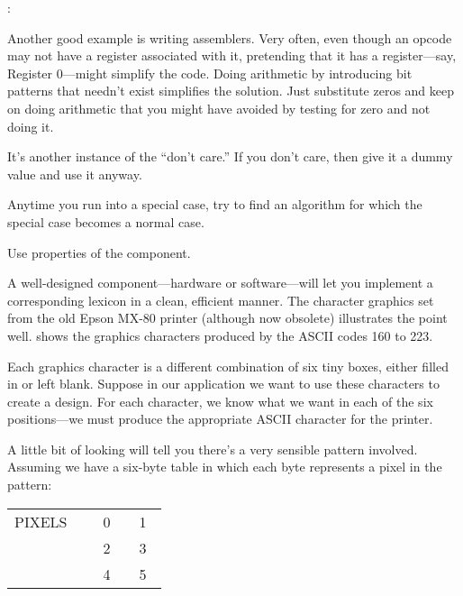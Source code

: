 \begin{interview}
:
\begin{tfquot}
Another good example is writing assemblers. Very often, even though an
opcode may not have a register associated with it, pretending that it has a
register---say, Register 0---might simplify the code. Doing arithmetic by
introducing bit patterns that needn't exist simplifies the solution. Just
substitute zeros and keep on doing arithmetic that you might have avoided
by testing for zero and not doing it.

It's another instance of the ``don't care.'' If you don't care, then give
it a dummy value and use it anyway.
\end{tfquot}
\end{interview}
Anytime you run into a special case, try to find an algorithm for which
the special case becomes a normal case.

\begin{tip}
Use properties of the component.
\end{tip}
A well-designed component---hardware or software---will let you implement
a corresponding lexicon in a clean, efficient manner. The character
graphics set from the old Epson MX-80 printer (although now obsolete)
illustrates the point well.  shows the graphics characters
produced by the ASCII codes 160 to 223.



Each graphics character is a different combination of six tiny boxes,
either filled in or left blank. Suppose in our application we want to use
these characters to create a design. For each character, we know what we
want in each of the six positions---we must produce the appropriate
ASCII character for the printer.

A little bit of looking will tell you there's a very sensible pattern
involved. Assuming we have a six-byte table in which each byte represents
a pixel in the pattern:

\bigskip
{\sf\begin{tabular}{l|c|c|} \cline{2-3}
PIXELS~~ & ~0~ & ~1~ \\ \cline{2-3}
       & 2 & 3 \\ \cline{2-3}
       & 4 & 5 \\ \cline{2-3}
\end{tabular}}\bigskip

